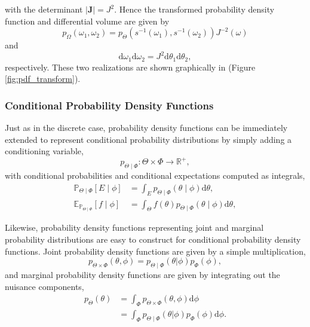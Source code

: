 \documentclass[11pt, oneside]{article}
\newcommand{\dd}{ \mathrm{d} }
\newcommand{\PP}{ \mathbb{P} }
\begin{document}
%
with the determinant $| \mathbf{J} | = J^{2}$.  Hence the transformed
probability density function and differential volume are given by
%
\begin{equation*}
p_{\Omega} \! \left( \omega_{1}, \omega_{2} \right)
=
p_{\Theta} \! \left( 
s^{-1} \! \left( \omega_{1} \right), 
s^{-1} \! \left( \omega_{2} \right) \right)
J^{-2} \! \left( \omega \right)
\end{equation*}
%
and
%
\begin{equation*}
\dd \omega_{1} \dd \omega_{2}
=
J^{2} \dd \theta_{1} \dd \theta_{2},
\end{equation*}
%
respectively.  These two realizations are shown graphically in 
(Figure \ref{fig:pdf_transform}).

\subsubsection{Conditional Probability Density Functions}

Just as in the discrete case, probability density functions can be immediately
extended to represent conditional probability distributions by simply adding a 
conditioning variable,
%
\begin{equation*}
p_{\Theta \mid \Phi} : \Theta \times \Phi \rightarrow \mathbb{R}^{+},
\end{equation*}
%
with conditional probabilities and conditional expectations computed
as integrals,
%
\begin{align*}
\PP_{\Theta \mid \Phi}  \! \left[ E \mid \phi \right]
&=
\int_{E} p_{\Theta \mid \Phi}  \! \left( \theta \mid \phi \right) \dd \theta,
\\
\mathbb{E}_{\PP_{\Theta \mid \Phi} } \! \left[ f \mid \phi \right]
&=
\int_{\Theta} f \! \left( \theta \right) 
p_{\Theta \mid \Phi}  \! \left( \theta \mid \phi \right) \dd \theta,
\end{align*}

Likewise, probability density functions representing joint and marginal 
probability distributions are easy to construct for conditional probability 
density functions.  Joint probability density functions are given by a simple
multiplication,
%
\begin{equation*}
p_{\Theta \times \Phi} \! \left( \theta, \phi \right) = 
p_{\Theta \mid \Phi} \! \left( \theta | \phi \right) p_{\Phi} \! \left( \phi \right),
\end{equation*}
%
and marginal probability density functions are given by integrating out the
nuisance components,
%
\begin{align*}
p_{\Theta} \! \left( \theta \right)
&= 
\int_{\Phi} p_{\Theta \times \Phi} \! \left( \theta, \phi \right) \dd \phi \\
&=
\int_{\Phi}
p_{\Theta \mid \Phi} \! \left( \theta | \phi \right) 
p_{\Phi} \! \left( \phi \right) \dd \phi.
\end{align*}
\end{document}
